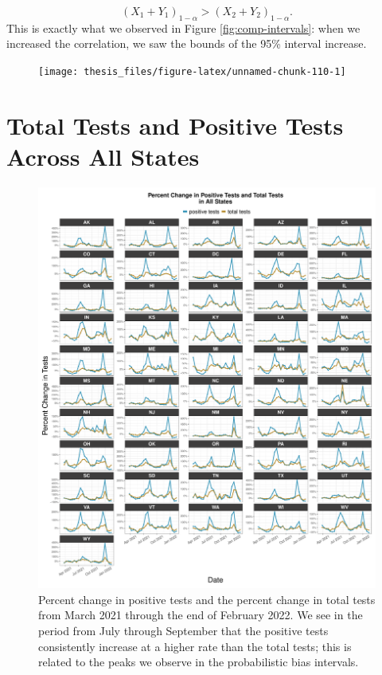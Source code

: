 \documentclass[12pt,twoside]{smiththesis}
\begin{document}
\[(X_1+Y_1)_{1-\alpha} > (X_2+Y_2)_{1-\alpha}.\]
This is exactly what we observed in Figure \ref{fig:comp-intervals}: when we increased the correlation, we saw the bounds of the 95\% interval increase.
\begin{figure}

{\centering \texttt{[image: thesis\_files/figure-latex/unnamed-chunk-110-1]} 

}

\caption{\label{fig:erf}}\label{fig:unnamed-chunk-110}
\end{figure}
\hypertarget{total-tests-and-positive-tests-across-all-states}{%
\section{Total Tests and Positive Tests Across All States}\label{total-tests-and-positive-tests-across-all-states}}
\begin{figure}

{\centering \includegraphics[width=1\linewidth]{figure/test_capacity_all_states} 

}

\caption{\label{fig:test-capacity-all-states} Percent change in positive tests and the percent change in total tests from March 2021 through the end of February 2022. We see in the period from July through September that the positive tests consistently increase at a higher rate than the total tests; this is related to the peaks we observe in the probabilistic bias intervals.}\label{fig:unnamed-chunk-113}
\end{figure}
\end{document}

